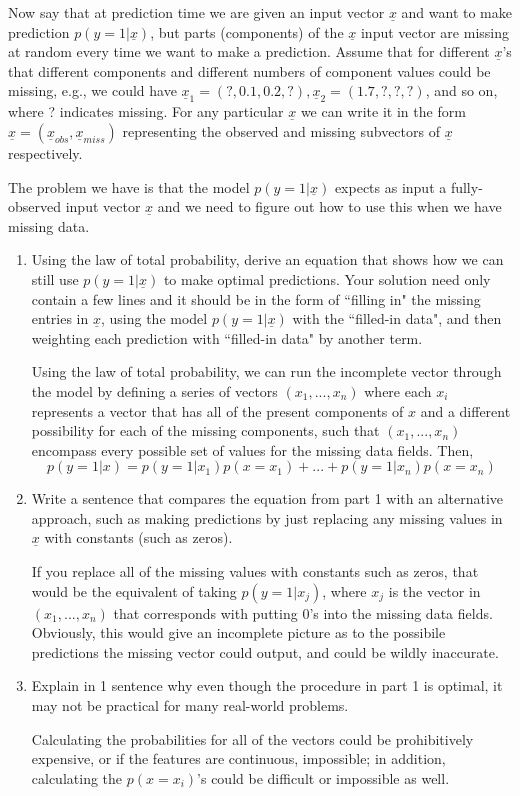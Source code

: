 \documentclass[11pt]{article}
\def\ux{\underline{x}}
\begin{document}
Now say that at prediction time we are given an input vector $\ux$ and want to make  prediction  $p(y = 1 | \ux)$, but parts (components) of the $\ux$ input vector are missing at random every time we want to make a prediction. Assume that for different $\ux$'s that different components and different numbers of component values could be missing, e.g., we could have $\ux_1 = (?, 0.1, 0.2, ?), \ux_2 = (1.7, ?, ?, ?)$, and so on, where ? indicates missing.  For any particular $\ux$ we can write it in the form $\ux = (\ux_{obs}, \ux_{miss})$ representing the observed and missing subvectors of $\ux$ respectively.

The problem we have is that the model $p(y = 1 | \ux)$ expects as input a fully-observed input vector $\ux$ and we need to figure out how to use this when we have missing data.
\begin{enumerate}
\item Using the law of total probability, derive an equation that shows how we can still use $p(y = 1 | \ux)$ to make optimal predictions. Your solution need only contain a few lines and it should be in the form of ``filling in" the missing entries in $\ux$,   using the model $p(y = 1 | \ux)$ with the ``filled-in data", and then weighting each prediction with ``filled-in data"  by another term.

Using the law of total probability, we can run the incomplete vector through the model by defining a series of vectors $(x_1, ..., x_n)$ where each $x_i$ represents a vector that has all of the present components of $x$ and a different possibility for each of the missing components, such that $(x_1, ..., x_n)$ encompass every possible set of values for the missing data fields. Then, 
\begin{equation}
	p(y=1|x) = p(y=1|x_1)p(x = x_1) + ... + p(y=1|x_n)p(x = x_n)
\end{equation}

\item Write a sentence that compares the equation from part 1 with an alternative approach, such as making predictions by just replacing any missing values in $\ux$ with constants (such as zeros).

If you replace all of the missing values with constants such as zeros, that would be the equivalent of taking $p(y=1|x_j)$, where $x_j$ is the vector in $(x_1, ..., x_n)$ that corresponds with putting 0's into the missing data fields. Obviously, this would give an incomplete picture as to the possibile predictions the missing vector could output, and could be wildly inaccurate.

\item Explain in 1 sentence why even though the procedure in part 1 is optimal, it may not be practical for many real-world problems.

Calculating the probabilities for all of the vectors could be prohibitively expensive, or if the features are continuous, impossible; in addition, calculating the $p(x=x_i)$'s could be difficult or impossible as well.
\end{enumerate}
\end{document}
